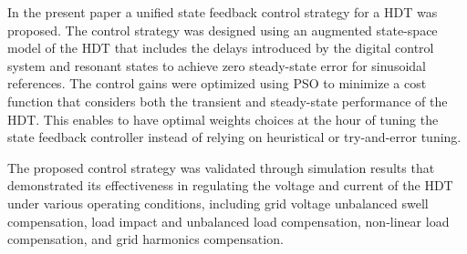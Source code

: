 In the present paper a unified state feedback control strategy for a HDT was proposed. The control strategy was designed using an augmented state-space model of the HDT that includes the delays introduced by the digital control system and resonant states to achieve zero steady-state error for sinusoidal references. The control gains were optimized using PSO to minimize a cost function that considers both the transient and steady-state performance of the HDT. This enables to have optimal weights choices at the hour of tuning the state feedback controller instead of relying on heuristical or try-and-error tuning.

The proposed control strategy was validated through simulation results that demonstrated its effectiveness in regulating the voltage and current of the HDT under various operating conditions, including grid voltage unbalanced swell compensation, load impact and unbalanced load compensation, non-linear load compensation, and grid harmonics compensation.
